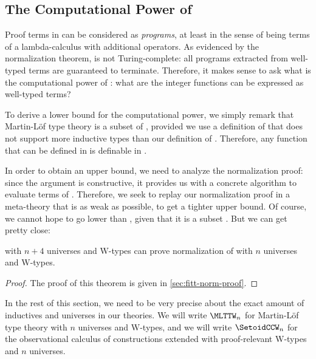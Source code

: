 \subsection{The Computational Power of \SetoidCC}

Proof terms in \SetoidCC can be considered as \emph{programs}, at least in the 
sense of being terms of a lambda-calculus with additional operators.
% 
As evidenced by the normalization theorem, \SetoidCC is not Turing-complete:
all programs extracted from well-typed terms are guaranteed to terminate.
% 
Therefore, it makes sense to ask what is the computational power of 
\SetoidCC: what are the integer functions 
% 
% 
can be expressed as well-typed terms?

To derive a lower bound for the computational power, we simply remark 
that Martin-Löf type theory is a subset of \SetoidCC, provided we use a 
definition of \MLTT that does not support more inductive types than our 
definition of \SetoidCC.
%
Therefore, any function that can be defined in \MLTT is definable in \SetoidCC.

In order to obtain an upper bound, we need to analyze the normalization proof:
since the argument is constructive, it provides us with a concrete algorithm to 
evaluate terms of \SetoidCC. 
% 
Therefore, we seek to replay our normalization proof in a meta-theory that is 
as weak as possible, to get a tighter upper bound. Of course, we cannot
hope to go lower than \MLTT, given that it is a subset \SetoidCC. But we
can get pretty close:

\begin{theorem}\label{setoidCC-in-MLTT}
  \MLTT with \( n + 4 \) universes and \( \mathrm{W} \)-types can prove normalization of 
  \SetoidCC with \( n \) universes and \( \mathrm{W} \)-types.
\end{theorem}
\begin{proof}
  The proof of this theorem is given in \cref{sec:fitt-norm-proof}.
\end{proof}

In the rest of this section, we need to be very precise about the exact
amount of inductives and universes in our theories.
We will write \( \MLTTW_n \) for Martin-Löf type 
theory with \( n \) universes and \( \mathrm{W} \)-types, and we will write
\( \SetoidCCW_n \) for the observational calculus of constructions extended 
with proof-relevant \( \mathrm{W} \)-types and \( n \) universes.

